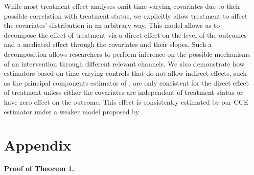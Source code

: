 \documentclass[12pt,fleqn]{article}
\begin{document}
While most treatment effect analyses omit time-varying covariates due to their possible correlation with treatment status, we explicitly allow treatment to affect the covariates' distribution in an arbitrary way. This model allows us to decompose the effect of treatment via a direct effect on the level of the outcomes and a mediated effect through the covariates and their slopes. Such a decomposition allows researchers to perform inference on the possible mechanisms of an intervention through different relevant channels. We also demonstrate how estimators based on time-varying controls that do not allow indirect effects, such as the principal components estimator of \citet{chan2022pcdid}, are only consistent for the direct effect of treatment unless either the covariates are independent of treatment status or have zero effect on the outcome. This effect is consistently estimated by our CCE estimator under a weaker model proposed by \citet{Brown_Schmidt_Wooldridge_2021}. 






\pagebreak



\pagebreak

\appendix

\renewcommand{\theequation}{A.\arabic{equation}}

\section*{Appendix}

\noindent \textbf{Proof of Theorem 1.}

\medskip
\end{document}
